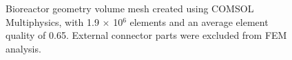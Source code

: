 \begin{figure}
\caption{Bioreactor geometry volume mesh created using COMSOL Multiphysics, with 1.9 $\times$ 10$^{6}$ elements and an average element quality of 0.65. External connector parts were excluded from \ac{FEM} analysis.}
\label{figMesh}
\end{figure}   

